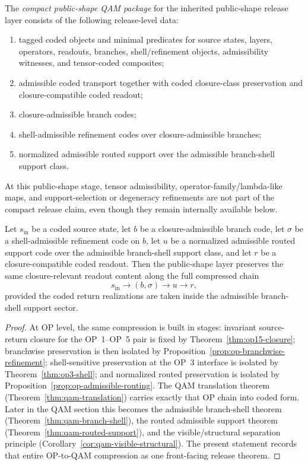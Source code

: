 \begin{definition}
The \emph{compact public-shape QAM package} for the inherited public-shape  release layer consists of the following release-level data:
\begin{enumerate}[leftmargin=2em]
 \item tagged coded objects and minimal predicates for source states, layers, operators, readouts, branches, shell/refinement objects, admissibility witnesses, and tensor-coded composites;
 \item admissible coded transport together with coded closure-class preservation and closure-compatible coded readout;
 \item closure-admissible branch codes;
 \item shell-admissible refinement codes over closure-admissible branches;
 \item normalized admissible routed support over the admissible branch-shell support class.
\end{enumerate}
At this public-shape stage, tensor admissibility, operator-family/lambda-like maps, and support-selection or degeneracy refinements are not part of the compact release claim, even though they remain internally available below.
\end{definition}

\begin{theorem}\label{thm:compact-public-shape-preservation}
Let $s_{\mathrm{in}}$ be a coded source state, let $b$ be a closure-admissible branch code, let $\sigma$ be a shell-admissible refinement code on $b$, let $u$ be a normalized admissible routed support code over the admissible branch-shell support class, and let $r$ be a closure-compatible coded readout. Then the  public-shape layer preserves the same closure-relevant readout content along the full compressed chain
\[
s_{\mathrm{in}}
\longrightarrow
(b,\sigma)
\longrightarrow
u
\longrightarrow
r,
\]
provided the coded return realizations are taken inside the admissible branch-shell support sector.
\end{theorem}

\begin{proof}
At OP level, the same compression is built in stages: invariant source-return closure for the OP~1--OP~5 pair is fixed by Theorem~\ref{thm:op15-closure}; branchwise preservation is then isolated by Proposition~\ref{prop:op-branchwise-refinement}; shell-sensitive preservation at the OP~3 interface is isolated by Theorem~\ref{thm:op3-shell}; and normalized routed preservation is isolated by Proposition~\ref{prop:op-admissible-routing}. The QAM translation theorem (Theorem~\ref{thm:qam-translation}) carries exactly that OP chain into coded form. Later in the QAM section this becomes the admissible branch-shell theorem (Theorem~\ref{thm:qam-branch-shell}), the routed admissible support theorem (Theorem~\ref{thm:qam-routed-support}), and the visible/structural separation principle (Corollary~\ref{cor:qam-visible-structural}). The present statement records that entire OP-to-QAM compression as one front-facing release theorem.
\end{proof}

